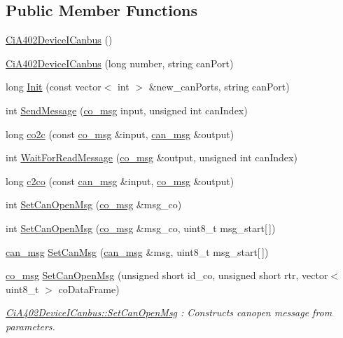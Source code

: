 \subsection*{Public Member Functions}
\begin{DoxyCompactItemize}
\item 
\hyperlink{classCiA402DeviceICanbus_a557d59fe9c75dbdd0fc2cf2b3340e95a}{Ci\+A402\+Device\+I\+Canbus} ()
\item 
\hyperlink{classCiA402DeviceICanbus_a205b5105bd658b73b582cf1685f1d320}{Ci\+A402\+Device\+I\+Canbus} (long number, string can\+Port)
\item 
long \hyperlink{classCiA402DeviceICanbus_a757447054eadb6824cf779ca58d276ae}{Init} (const vector$<$ int $>$ \&new\+\_\+can\+Ports, string can\+Port)
\item 
int \hyperlink{classCiA402DeviceICanbus_ac831e319febc65d424955e32ecdf72c3}{Send\+Message} (\hyperlink{structco__msg}{co\+\_\+msg} input, unsigned int can\+Index)
\item 
long \hyperlink{classCiA402DeviceICanbus_aa108188c7f32a1c5d1f50662e66c6676}{co2c} (const \hyperlink{structco__msg}{co\+\_\+msg} \&input, \hyperlink{structcan__msg}{can\+\_\+msg} \&output)
\item 
int \hyperlink{classCiA402DeviceICanbus_a1f8d07b892461470a29ac5d30f3dd679}{Wait\+For\+Read\+Message} (\hyperlink{structco__msg}{co\+\_\+msg} \&output, unsigned int can\+Index)
\item 
long \hyperlink{classCiA402DeviceICanbus_aab504488399b2d5a5a010efef29e3d64}{c2co} (const \hyperlink{structcan__msg}{can\+\_\+msg} \&input, \hyperlink{structco__msg}{co\+\_\+msg} \&output)
\item 
int \hyperlink{classCiA402DeviceICanbus_aa439b9175f5879282058a3f4c2edb45d}{Set\+Can\+Open\+Msg} (\hyperlink{structco__msg}{co\+\_\+msg} \&msg\+\_\+co)
\item 
int \hyperlink{classCiA402DeviceICanbus_af09467b107e73f67804942db1597d983}{Set\+Can\+Open\+Msg} (\hyperlink{structco__msg}{co\+\_\+msg} \&msg\+\_\+co, uint8\+\_\+t msg\+\_\+start\mbox{[}$\,$\mbox{]})
\item 
\hyperlink{structcan__msg}{can\+\_\+msg} \hyperlink{classCiA402DeviceICanbus_a93cde3041c3d0a26666b451aa70b246f}{Set\+Can\+Msg} (\hyperlink{structcan__msg}{can\+\_\+msg} \&msg, uint8\+\_\+t msg\+\_\+start\mbox{[}$\,$\mbox{]})
\item 
\hyperlink{structco__msg}{co\+\_\+msg} \hyperlink{classCiA402DeviceICanbus_ab861fc4d62c917bdb1c06b886c8ed45a}{Set\+Can\+Open\+Msg} (unsigned short id\+\_\+co, unsigned short rtr, vector$<$ uint8\+\_\+t $>$ co\+Data\+Frame)
\begin{DoxyCompactList}\small\item\em \hyperlink{classCiA402DeviceICanbus_aa439b9175f5879282058a3f4c2edb45d}{Ci\+A402\+Device\+I\+Canbus\+::\+Set\+Can\+Open\+Msg} \+: Constructs canopen message from parameters. \end{DoxyCompactList}\end{DoxyCompactItemize}
